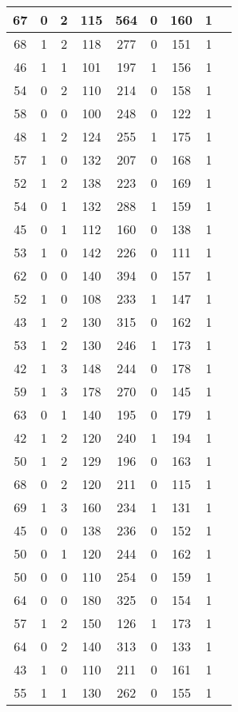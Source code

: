 \documentclass{article}
\begin{document}
\begin{longtable}{
|
c|c|c|c|c|c|c|c|c|}
\hline
67 & 0 & 2 & 115 & 564 & 0 & 160 & 1 \\
\hline
68 & 1 & 2 & 118 & 277 & 0 & 151 & 1 \\
\hline
46 & 1 & 1 & 101 & 197 & 1 & 156 & 1 \\
\hline
54 & 0 & 2 & 110 & 214 & 0 & 158 & 1 \\
\hline
58 & 0 & 0 & 100 & 248 & 0 & 122 & 1 \\
\hline
48 & 1 & 2 & 124 & 255 & 1 & 175 & 1 \\
\hline
57 & 1 & 0 & 132 & 207 & 0 & 168 & 1 \\
\hline
52 & 1 & 2 & 138 & 223 & 0 & 169 & 1 \\
\hline
54 & 0 & 1 & 132 & 288 & 1 & 159 & 1 \\
\hline
45 & 0 & 1 & 112 & 160 & 0 & 138 & 1 \\
\hline
53 & 1 & 0 & 142 & 226 & 0 & 111 & 1 \\
\hline
62 & 0 & 0 & 140 & 394 & 0 & 157 & 1 \\
\hline
52 & 1 & 0 & 108 & 233 & 1 & 147 & 1 \\
\hline
43 & 1 & 2 & 130 & 315 & 0 & 162 & 1 \\
\hline
53 & 1 & 2 & 130 & 246 & 1 & 173 & 1 \\
\hline
42 & 1 & 3 & 148 & 244 & 0 & 178 & 1 \\
\hline
59 & 1 & 3 & 178 & 270 & 0 & 145 & 1 \\
\hline
63 & 0 & 1 & 140 & 195 & 0 & 179 & 1 \\
\hline
42 & 1 & 2 & 120 & 240 & 1 & 194 & 1 \\
\hline
50 & 1 & 2 & 129 & 196 & 0 & 163 & 1 \\
\hline
68 & 0 & 2 & 120 & 211 & 0 & 115 & 1 \\
\hline
69 & 1 & 3 & 160 & 234 & 1 & 131 & 1 \\
\hline
45 & 0 & 0 & 138 & 236 & 0 & 152 & 1 \\
\hline
50 & 0 & 1 & 120 & 244 & 0 & 162 & 1 \\
\hline
50 & 0 & 0 & 110 & 254 & 0 & 159 & 1 \\
\hline
64 & 0 & 0 & 180 & 325 & 0 & 154 & 1 \\
\hline
57 & 1 & 2 & 150 & 126 & 1 & 173 & 1 \\
\hline
64 & 0 & 2 & 140 & 313 & 0 & 133 & 1 \\
\hline
43 & 1 & 0 & 110 & 211 & 0 & 161 & 1 \\
\hline
55 & 1 & 1 & 130 & 262 & 0 & 155 & 1 \\

\end{longtable}
\end{document}
